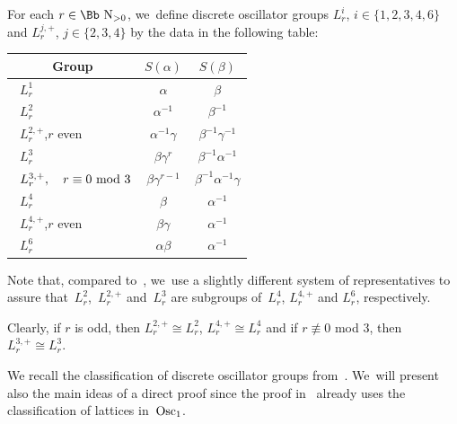 \documentclass[pdftex]{sigma}
\newcommand\NN{{\mbox{\Bb N}}}
\newcommand{\Osc}{{\rm Osc}}
\numberwithin{equation}{section}
\begin{document}
For each $r\in \NN_{>0}$, we~define discrete oscillator groups $L^i_r$, $i\in\{1,2,3,4,6\}$ and $L^{j,+}_r$, $j\in\{2,3,4\}$ by the data in the following table:
\begin{center}
{\renewcommand{\arraystretch}{1.5}
\begin{tabular}{l|c|c} \hline	
\multicolumn{1}{c|}{Group}		& $S(\alpha)$ 			& $S(\beta)$ 		\\
\hline
\ $L^1_r$ & $\alpha$ & $\beta$ \\ \hline
\ $L^2_r$ & $\alpha^{-1}$ & $\beta^{-1}$ \\ \hline
\ $L^{2,+}_r$,\quad $r$ even & $\alpha^{-1}\gamma$ & $\beta^{-1}\gamma^{-1}$ \\ \hline
\ $L^3_r$ & $\beta\gamma^r$ & $\beta^{-1}\alpha^{-1}$ \\ \hline
\ $L^{3,+}_r,\quad r\equiv 0\ {\rm mod}\ 3$ & $\beta\gamma^{r-1}$ & $\beta^{-1}\alpha^{-1}\gamma$ \\ \hline
\ $L^4_r$ & $\beta$ & $\alpha^{-1}$ \\ \hline
\ $L^{4,+}_r$,\quad $r$ even & $\beta\gamma$ & $\alpha^{-1}$ \\ \hline
\ $L^6_r$ & $\alpha\beta$ & $\alpha^{-1}$ \\ \hline
\end{tabular}}
\end{center}
Note that, compared to~\cite{F}, we~use a slightly different system of representatives to assure that~$L^{2}_r$,~$L^{2,+}_r$ and~$L^{3}_r$ are subgroups of~$L^{4}_r$, $L^{4,+}_r$ and $L^{6}_r$, respectively.

Clearly, if $r$ is odd, then $L^{2,+}_r\cong L^{2}_r$, $L^{4,+}_r\cong L^{4}_r$ and if $r\not\equiv 0$ mod $3$, then $L^{3,+}_r\cong L^{3}_r$.

We recall the classification of discrete oscillator groups from~\cite{F}. We~will present also the main ideas of a direct proof since the proof in~\cite{F} already uses the classification of lattices in~$\Osc_1$.
\end{document}
